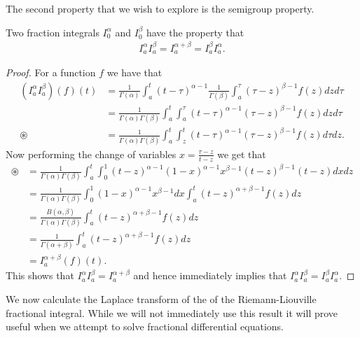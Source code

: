 The second property that we wish to explore is the semigroup property.
\begin{mdframed}[innertopmargin=10pt]
\begin{lemma}
    Two fraction integrals $ I_0^\alpha $ and $ I_0^\beta $ have the property that
    \begin{align*}
        I_a^\alpha I_a^\beta = I_a^{\alpha + \beta} = I_a^\beta I_a^\alpha.
    \end{align*}
\end{lemma}
\end{mdframed}
\begin{proof}
    For a function $ f $ we have that
    \begin{align*}
        (I_a^\alpha I_a^\beta)(f)(t) &= \frac{1}{\Gamma(\alpha)}\int_a^t (t-\tau)^{\alpha - 1}  \frac{1}{\Gamma(\beta)}\int_a^\tau (\tau - z)^{\beta - 1}f(z) dz d\tau \\
            &=\frac{1}{\Gamma(\alpha)\Gamma(\beta)} \int_a^t \int_a^\tau  (t-\tau)^{\alpha - 1}(\tau - z)^{\beta - 1}f(z) dz d\tau \\
            \circledast  &= \frac{1}{\Gamma(\alpha)\Gamma(\beta)} \int_a^t \int_z^t (t-\tau)^{\alpha - 1} (\tau - z)^{\beta - 1} f(z) d\tau dz.
    \end{align*}
    Now performing the change of variables $ x = \frac{\tau - z}{t - z} $ we get that
    \begin{align*}
        \circledast
        &= \frac{1}{\Gamma(\alpha)\Gamma(\beta)}\int_a^t \int_0^1 (t-z)^{\alpha - 1} (1-x)^{\alpha-1} x^{\beta - 1} (t-z)^{\beta - 1}(t-z) dx dz \\
        &= \frac{1}{\Gamma(\alpha)\Gamma(\beta)}\int_0^1 (1-x)^{\alpha - 1} x^{\beta - 1} dx \int_a^t (t-z)^{\alpha + \beta - 1} f(z) dz \\
        &= \frac{B(\alpha,\beta)}{\Gamma(\alpha)\Gamma(\beta)} \int_a^t (t-z)^{\alpha + \beta - 1} f(z) dz \\
        &= \frac{1}{\Gamma(\alpha + \beta)} \int_a^t (t-z)^{\alpha + \beta - 1} f(z) dz \\
        &= I_a^{\alpha + \beta}(f)(t).
    \end{align*}
    This shows that $ I_a^\alpha I_a^\beta = I_a^{\alpha + \beta} $ and hence immediately implies that $ I_a^\alpha I_a^\beta = I_a^\beta I_a^\alpha $.
\end{proof}
We now calculate the Laplace transform of the of the Riemann-Liouville fractional integral. While we will not immediately use this result it will prove useful when we attempt to solve fractional differential equations.
